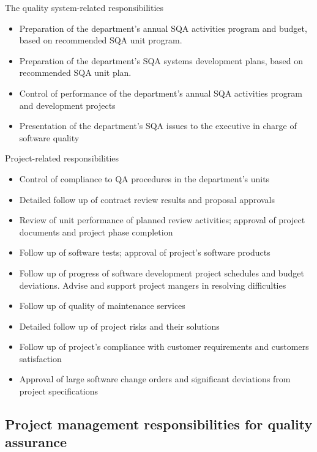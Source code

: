 \documentclass{article}
\begin{document}
\begin{flushleft}
The quality system-related responsibilities
\begin{itemize}
  \item Preparation of the department’s annual SQA activities program and budget, based on recommended SQA unit program.
  \item Preparation of the department’s SQA systems development plans, based on recommended SQA unit plan.
  \item Control of performance of the department’s annual SQA activities program and development projects
  \item Presentation of the department's SQA issues to the executive in charge of software quality
\end{itemize}
Project-related responsibilities
\begin{itemize}
  \item Control of compliance to QA procedures in the department's units
  \item Detailed follow up of contract review results and proposal approvals
  \item Review of unit performance of planned review activities; approval of project documents and project phase completion
  \item Follow up of software tests; approval of project’s software products
  \item Follow up of progress of software development project schedules and budget deviations. Advise and support project mangers in resolving difficulties
  \item Follow up of quality of maintenance services
  \item Detailed follow up of project risks and their solutions
  \item Follow up of project's compliance with customer requirements and customers satisfaction
  \item Approval of large software change orders and significant deviations from project specifications
\end{itemize}
\end{flushleft}

\subsection{Project management responsibilities for quality assurance}
\end{document}
